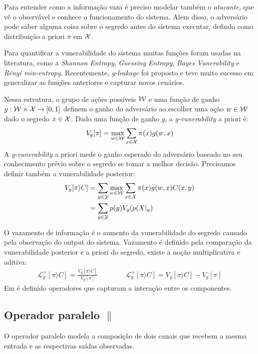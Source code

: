 Para entender como a informação vaza é preciso modelar também o \emph{atacante}, que vê o observável e conhece o funcionamento do sistema. Alem disso, o adversário pode saber alguma coisa sobre o segredo antes do sistema executar, defindo como distribuição a priori $\pi$ em $\mathcal{X}$.

Para quantificar a vunerabilidade do sistema muitas funções foram usadas na literatura, como a \emph{Shannon Entropy}\cite{Shannon:48:Bell}, \emph{Guessing Entropy}\cite{Massey:94:IT}, \emph{Bayes Vunerability}\cite{Braun:09:MFPS} e \emph{Rényi min-entropy}\cite{Smith:09:FOSSACS}. Recentemente, \emph{g-leakage}\cite{Alvim:12:CSF} foi proposto e teve muito sucesso em generalizar as funções anteriores e capturar novos cenários.

Nessa estrutura, o grupo de ações possíveis $\mathcal{W}$ e uma função de ganho $g:\mathcal{W} \times \mathcal{X} \rightarrow [0,1]$ definem o ganho do adversário ao escolher uma ação $w\in\mathcal{W}$ dado o segredo $x\in\mathcal{X}$. Dado uma função de ganho $g$, a \emph{g-vunerability} a priori é:
$$ V_g[\pi] = \max_{w\in\mathcal{W}} \sum_{x\in\mathcal{X}} \pi(x)g(w,x) $$
A \emph{g-vunerability} a priori mede o ganho esperado do adversário baseado no seu conhecimento prévio sobre o segredo se tomar a melhor decisão. Precisamos definir também a vunerabilidade posterior:
\begin{align*}
V_g[\pi\rangle C]  & = \sum_{y\in\mathcal{Y}} \max_{w\in\mathcal{W}} \sum_{x\in\mathcal{X}} \pi(x)g(w,x)C(x,y) \\
& = \sum_{y\in\mathcal{Y}} p(y) V_g(p(X|_y)
\end{align*}

O vazamento de informação é o aumento da vunerabilidade do segredo causado pela observação do output do sistema. 
Vazamento é definido pela comparação da vunerabilidade posterior e a priori do segredo, existe a noção multiplicativa e aditiva\cite{Alvim:14:CSF}:
\begin{align*}
\mathcal{L}^{\times}_{g}[\pi\rangle C] = \frac{V_g[\pi\rangle C]}{V_g[\pi]}&\hspace{1cm}&\mathcal{L}^{+}_{g}[\pi\rangle C] = {V_g[\pi\rangle C]} - {V_g[\pi]}
\end{align*}
Em\cite{Americo} é definido operadores que capturam a interação entre os componentes. 
\subsection*{Operador paralelo $\parallel$}  
O operador paralelo modela a composição de dois canais que recebem a mesma entrada e as respectivas saídas observadas. 

